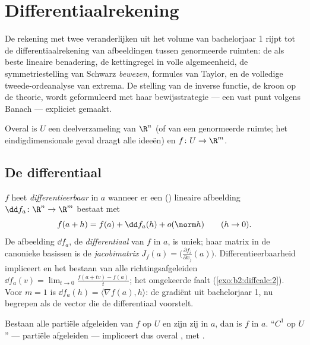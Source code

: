 \chapter{Differentiaalrekening}\label{ch:b2:diffcalc}

De rekening met twee veranderlijken uit het volume van
bachelorjaar 1 rijpt tot de differentiaalrekening van
afbeeldingen tussen genormeerde ruimten: de \emph{}
als beste lineaire benadering, de kettingregel in volle
algemeenheid, de symmetriestelling van Schwarz \emph{bewezen},
formules van Taylor, en de volledige tweede-ordeanalyse van
extrema. De stelling van de inverse functie, de kroon op de
theorie, wordt geformuleerd met haar bewijsstrategie --- een
vast punt volgens Banach --- expliciet gemaakt.

Overal is $U$ een  deelverzameling van $\R^n$ (of van een
genormeerde ruimte; het eindigdimensionale geval draagt alle
ideeën) en $f \colon U \to \R^m$.

\section{De differentiaal}

\begin{definition}\label{def:b2:diffcalc:differential}
$f$ heet \emph{differentieerbaar} in $a$
wanneer er een () lineaire afbeelding $\dd f_a \colon \R^n
\to \R^m$ bestaat met
\[
f(a + h) = f(a) + \dd f_a(h) + o(\norm h)
\qquad (h \to 0).
\]
De afbeelding $\dd f_a$, de \emph{differentiaal}
van $f$ in $a$, is uniek; haar matrix in de canonieke basissen is
de \emph{jacobimatrix} $J_f(a) =
\bigl(\frac{\partial f_i}{\partial x_j}(a)\bigr)$.
Differentieerbaarheid impliceert  en het bestaan van
alle richtingsafgeleiden $\dd f_a(v) = \lim_{t\to0}\frac{f(a + tv)
- f(a)}{t}$; het omgekeerde faalt (\cref{exo:b2:diffcalc:2}). Voor
$m = 1$ is $\dd f_a(h) = \langle \nabla f(a), h\rangle$: de
gradiënt uit bachelorjaar 1, nu begrepen als de vector die de
differentiaal voorstelt.
\end{definition}

\begin{theorem}[$C^1$-criterium]\label{thm:b2:diffcalc:c1}
Bestaan alle partiële afgeleiden van $f$ op $U$ en zijn zij
 in $a$, dan is $f$  in $a$. ``$C^1$ op
$U$'' ---  partiële afgeleiden --- impliceert dus overal
, met  .
\end{theorem}

